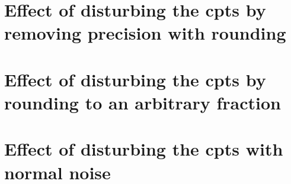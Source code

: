 \documentclass[11pt]{amsart}
\begin{document}
\clearpage

\section{Effect of disturbing the cpts by removing precision with rounding}
\let\oldcentering\centering
\renewcommand\centering{\tiny\oldcentering}

\clearpage
\section{Effect of disturbing the cpts by rounding to an arbitrary fraction}

\clearpage
\section{Effect of disturbing the cpts with normal noise}

\clearpage
\end{document}
